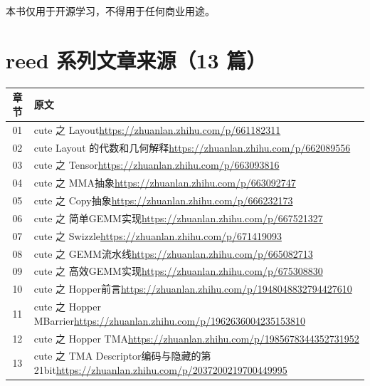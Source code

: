 \documentclass[9pt,openany]{ctexbook}
\begin{document}
本书仅用于开源学习，不得用于任何商业用途。

\section*{reed 系列文章来源（13 篇）}
\begingroup\small
\begin{tabular}{@{}c>{\raggedright\arraybackslash}p{}@{}}
  \toprule
  章节 & 原文 \\
  \midrule
  01 & cute 之 Layout\newline\url{https://zhuanlan.zhihu.com/p/661182311} \\
  02 & cute Layout 的代数和几何解释\newline\url{https://zhuanlan.zhihu.com/p/662089556} \\
  03 & cute 之 Tensor\newline\url{https://zhuanlan.zhihu.com/p/663093816} \\
  04 & cute 之 MMA抽象\newline\url{https://zhuanlan.zhihu.com/p/663092747} \\
  05 & cute 之 Copy抽象\newline\url{https://zhuanlan.zhihu.com/p/666232173} \\
  06 & cute 之 简单GEMM实现\newline\url{https://zhuanlan.zhihu.com/p/667521327} \\
  07 & cute 之 Swizzle\newline\url{https://zhuanlan.zhihu.com/p/671419093} \\
  08 & cute 之 GEMM流水线\newline\url{https://zhuanlan.zhihu.com/p/665082713} \\
  09 & cute 之 高效GEMM实现\newline\url{https://zhuanlan.zhihu.com/p/675308830} \\
  10 & cute 之 Hopper前言\newline\url{https://zhuanlan.zhihu.com/p/1948048832794427610} \\
  11 & cute 之 Hopper MBarrier\newline\url{https://zhuanlan.zhihu.com/p/1962636004235153810} \\
  12 & cute 之 Hopper TMA\newline\url{https://zhuanlan.zhihu.com/p/1985678344352731952} \\
  13 & cute 之 TMA Descriptor编码与隐藏的第21bit\newline\url{https://zhuanlan.zhihu.com/p/2037200219700449995} \\
  \bottomrule
\end{tabular}
\endgroup
\end{document}
